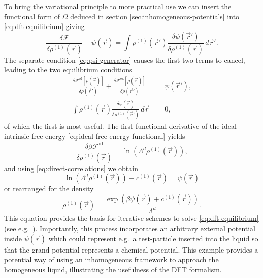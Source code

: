To bring the variational principle to more practical use we can insert the functional form of $\Omega$ deduced in section \ref{sec:inhomogeneous-potentials} into \eqref{eq:dft-equilibrium} giving
\begin{equation*}
  \frac{\delta \mathcal{F}}{\delta \rho^{(1)}(\vec{r})}
  - \psi(\vec{r})
  =
  \int
  \rho^{(1)}(\vec{r}') \frac{\delta \psi(\vec{r}')}{\delta \rho^{(1)}(\vec{r})}
  \, d\vec{r}'.
\end{equation*}
The separate condition \eqref{eq:psi-generator} causes the first two terms to cancel, leading to the two equilibrium conditions
\begin{subequations}
  \begin{align}
    \label{eq:fmt-psi-equilibrium}
    \frac{\delta \mathcal{F}^\mathrm{id}[\rho(\vec{r})]}{\delta \rho(\vec{r}')}
    + \frac{\delta \mathcal{F}^\mathrm{ex}[\rho(\vec{r})]}{\delta \rho(\vec{r}')}
    &=
    \psi(\vec{r}'),
    \\
    \int
    \rho^{(1)}(\vec{r}) \frac{\delta \psi(\vec{r})}{\delta \rho^{(1)}(\vec{r}')}
    \, d\vec{r}
    &=
    0,
  \end{align}
\end{subequations}
of which the first is most useful.
The first functional derivative of the ideal intrinsic free energy \eqref{eq:ideal-free-energy-functional} yields
\begin{equation*}
  \frac{
    \delta \beta \mathcal{F}^\mathrm{id}
  }{
    \delta \rho^{(1)}(\vec{r})
  }
  =
  \ln{(\Lambda^d \rho^{(1)}(\vec{r}))},
\end{equation*}
and using %
\eqref{eq:direct-correlations} we obtain
\begin{equation*}
  \ln{(\Lambda^d \rho^{(1)}(\vec{r}))}
  - c^{(1)}(\vec{r})
  =
  \psi(\vec{r})
\end{equation*}
or rearranged for the density
\begin{equation}\label{eq:equilibrium-density}
  \rho^{(1)}(\vec{r})
  =
  \frac{
    \exp{\left(\beta\psi(\vec{r}) + c^{(1)}(\vec{r})\right)}
  }{ \Lambda^d }.
\end{equation}
This equation provides the basis for iterative schemes to solve \eqref{eq:dft-equilibrium} (see e.g.\ \cite{RothJPCM2010}).
Importantly, this process incorporates an arbitrary external potential inside $\psi(\vec{r})$ which could represent e.g.\ a test-particle inserted into the liquid so that the grand potential represents a chemical potential.
This example provides a potential way of using an inhomogeneous framework to approach the homogeneous liquid, illustrating the usefulness of the DFT formalism.

